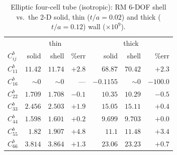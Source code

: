 \begin{table}[htpb]
\centering
\small
\caption{Elliptic four-cell tube (isotropic): RM 6-DOF shell vs.\ the 2-D solid, thin ($t/a=0.02$) and thick ($t/a=0.12$) wall ($\times10^{9}$).}
\label{tab:elliso}
\setlength{\tabcolsep}{4.5pt}
\begin{tabular}{l|rrr|rrr}
\hline
 & \multicolumn{3}{c|}{thin} & \multicolumn{3}{c}{thick} \\
$C^{b}_{ij}$ & solid & shell & \%err & solid & shell & \%err \\
\hline
$C^{b}_{11}$ & $11.42$ & $11.74$ & $+2.8$ & $68.87$ & $70.42$ & $+2.3$ \\
$C^{b}_{16}$ & $\sim\!0$ & $\sim\!0$ & --- & $-0.1155$ & $\sim\!0$ & $-100.0$ \\
$C^{b}_{22}$ & $1.709$ & $1.708$ & $-0.1$ & $10.35$ & $10.29$ & $-0.5$ \\
$C^{b}_{33}$ & $2.456$ & $2.503$ & $+1.9$ & $15.05$ & $15.11$ & $+0.4$ \\
$C^{b}_{44}$ & $1.598$ & $1.601$ & $+0.2$ & $9.699$ & $9.703$ & $+0.0$ \\
$C^{b}_{55}$ & $1.82$ & $1.907$ & $+4.8$ & $11.1$ & $11.48$ & $+3.4$ \\
$C^{b}_{66}$ & $3.814$ & $3.864$ & $+1.3$ & $23.06$ & $23.23$ & $+0.7$ \\
\hline
\end{tabular}
\end{table}